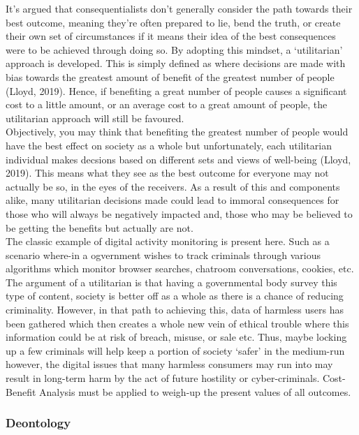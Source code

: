 \documentclass[11pt, english]{article}
\begin{document}
	It's argued that consequentialists don't generally consider the path towards their best outcome, meaning they're often prepared to lie, bend the truth, or create their own set of circumstances if it means their idea of the best consequences were to be achieved through doing so. By adopting this mindset, a `utilitarian' approach is developed. This is simply defined as where decisions are made with bias towards the greatest amount of benefit of the greatest number of people (Lloyd, 2019). Hence, if benefiting a great number of people causes a significant cost to a little amount, or an average cost to a great amount of people, the utilitarian approach will still be favoured.\\

	Objectively, you may think that benefiting the greatest number of people would have the best effect on society as a whole but unfortunately, each utilitarian individual makes decsions based on different sets and views of well-being (Lloyd, 2019). This means what they see as the best outcome for everyone may not actually be so, in the eyes of the receivers. As a result of this and components alike, many utilitarian decisions made could lead to immoral consequences for those who will always be negatively impacted and, those who may be believed to be getting the benefits but actually are not.\\

	The classic example of digital activity monitoring is present here. Such as a scenario where-in a ogvernment wishes to track criminals through various algorithms which monitor browser searches, chatroom conversations, cookies, etc. The argument of a utilitarian is that having a governmental body survey this type of content, society is better off as a whole as there is a chance of reducing criminality. However, in that path to achieving this, data of harmless users has been gathered which then creates a whole new vein of ethical trouble where this information could be at risk of breach, misuse, or sale etc. Thus, maybe locking up a few criminals will help keep a portion of society `safer' in the medium-run however, the digital issues that many harmless consumers may run into may result in long-term harm by the act of future hostility or cyber-criminals. Cost-Benefit Analysis must be applied to weigh-up the present values of all outcomes.

		\subsubsection{Deontology}
\end{document}
